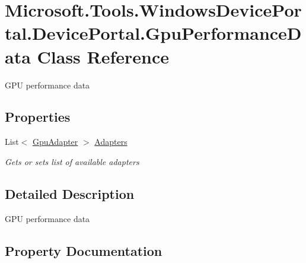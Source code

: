 \hypertarget{class_microsoft_1_1_tools_1_1_windows_device_portal_1_1_device_portal_1_1_gpu_performance_data}{}\section{Microsoft.\+Tools.\+Windows\+Device\+Portal.\+Device\+Portal.\+Gpu\+Performance\+Data Class Reference}
\label{class_microsoft_1_1_tools_1_1_windows_device_portal_1_1_device_portal_1_1_gpu_performance_data}


G\+PU performance data  


\subsection*{Properties}
\begin{DoxyCompactItemize}
\item 
List$<$ \hyperlink{class_microsoft_1_1_tools_1_1_windows_device_portal_1_1_device_portal_1_1_gpu_adapter}{Gpu\+Adapter} $>$ \hyperlink{class_microsoft_1_1_tools_1_1_windows_device_portal_1_1_device_portal_1_1_gpu_performance_data_afd66b159f115e90f211611a4784a252a}{Adapters}
\begin{DoxyCompactList}\small\item\em Gets or sets list of available adapters \end{DoxyCompactList}\end{DoxyCompactItemize}


\subsection{Detailed Description}
G\+PU performance data 



\subsection{Property Documentation}
